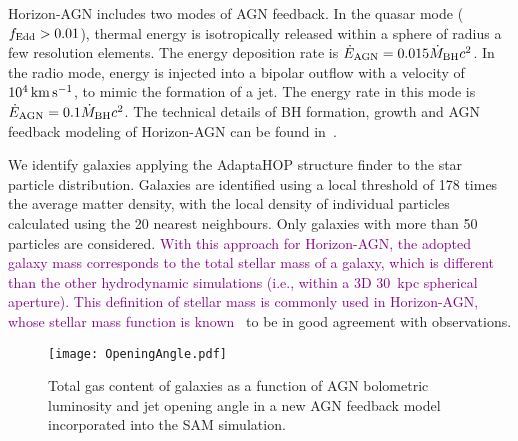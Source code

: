 \documentclass[twocolumn]{aastex631}
\newcommand{\todo}[1]{\textcolor{red}{[{\bf TODO}: #1]}}
\newcommand{\red}[1]{\textcolor{purple}{#1}}
\def\smass{{$M_*$}}
\begin{document}
Horizon-AGN includes two modes of AGN feedback. In the quasar mode ($f_{\rm Edd}>0.01$), thermal energy is isotropically released within a sphere of radius a few resolution elements. The energy deposition rate is $\dot{E}_{\rm AGN} = 0.015 \dot{M}_{\rm BH} c^2$. In the radio mode, energy is injected into a bipolar  outflow  with  a  velocity  of  $10^4\,\rm km\,s^{-1}$, to  mimic the  formation  of  a  jet.  The  energy  rate  in  this  mode is $\dot{E}_{\rm AGN} = 0.1 \dot{M}_{\rm BH} c^2$.  The  technical  details  of  BH  formation,  growth  and AGN  feedback  modeling  of  Horizon-AGN  can be found in~\citet{2012MNRAS.420.2662D}.

We identify galaxies applying the AdaptaHOP structure finder \citep{Aubert+04,Tweed+09} to the star particle distribution.  Galaxies are identified using a local threshold of 178 times the average matter density, with the local density of individual particles calculated using the 20 nearest neighbours. Only galaxies with more than 50 particles are considered. \red{With this approach for Horizon-AGN, the adopted galaxy mass corresponds to the total stellar mass of a galaxy, which is different than the other hydrodynamic simulations (i.e., within a 3D 30~kpc spherical aperture). This definition of stellar mass is commonly used in Horizon-AGN, whose stellar mass function is known~\citep{2017MNRAS.467.4739K}} to be in good agreement with observations.



\begin{figure}
\centering
\texttt{[image: OpeningAngle.pdf]}
\caption{\label{fig:SAM} 
Total gas content of galaxies as a function of AGN bolometric luminosity and jet opening angle in a new AGN feedback model incorporated into the SAM simulation.
}
\end{figure} 
\end{document}
